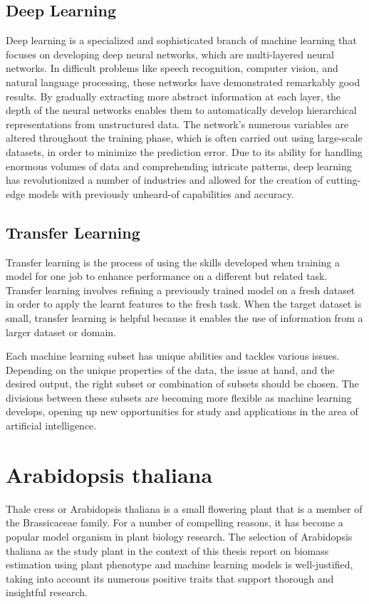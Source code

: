 \documentclass[a4paper,11pt]{report}%
\renewcommand{\\}{\vspace*{0.5\baselineskip} \newline}
\begin{document}
\subsection{Deep Learning}
Deep learning is a specialized and sophisticated branch of machine learning that focuses on developing deep neural networks, which are multi-layered neural networks. In difficult problems like speech recognition, computer vision, and natural language processing, these networks have demonstrated remarkably good results. By gradually extracting more abstract information at each layer, the depth of the neural networks enables them to automatically develop hierarchical representations from unstructured data. The network's numerous variables are altered throughout the training phase, which is often carried out using large-scale datasets, in order to minimize the prediction error. Due to its ability for handling enormous volumes of data and comprehending intricate patterns, deep learning has revolutionized a number of industries and allowed for the creation of cutting-edge models with previously unheard-of capabilities and accuracy.

\subsection{Transfer Learning}
Transfer learning is the process of using the skills developed when training a model for one job to enhance performance on a different but related task. Transfer learning involves refining a previously trained model on a fresh dataset in order to apply the learnt features to the fresh task. When the target dataset is small, transfer learning is helpful because it enables the use of information from a larger dataset or domain.
\bigskip
\bigskip

\noindent Each machine learning subset has unique abilities and tackles various issues. Depending on the unique properties of the data, the issue at hand, and the desired output, the right subset or combination of subsets should be chosen. The divisions between these subsets are becoming more flexible as machine learning develops, opening up new opportunities for study and applications in the area of artificial intelligence.




\section{Arabidopsis thaliana}
Thale cress or Arabidopsis thaliana is a small flowering plant that is a member of the Brassicaceae family. For a number of compelling reasons, it has become a popular model organism in plant biology research. The selection of Arabidopsis thaliana as the study plant in the context of this thesis report on biomass estimation using plant phenotype and machine learning models is well-justified, taking into account its numerous positive traits that support thorough and insightful research.
\end{document}
